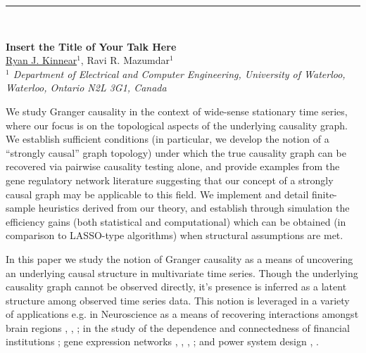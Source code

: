 \documentclass[12pt]{article}
\begin{document}
\hspace{-0.70cm}\rule{17.5cm}{0.01 in} \\
\vspace{-0.4cm}
\begin{flushleft}
\Large \textbf{\noindent
Insert the Title of Your Talk Here}
\\
\vspace{0.5cm}
\normalsize
\normalsize{
 \underline{Ryan J. Kinnear}$^1$, Ravi R. Mazumdar$^1$
} \\
\vspace{5mm}
\textit{\footnotesize
$^1$ Department of Electrical and Computer Engineering, University of Waterloo, Waterloo, Ontario N2L 3G1, Canada\\
}
\end{flushleft}

We study Granger causality in the context of wide-sense stationary
time series, where our focus is on the topological aspects of the
underlying causality graph.  We establish sufficient conditions (in
particular, we develop the notion of a ``strongly causal'' graph
topology) under which the true causality graph can be recovered via
pairwise causality testing alone, and provide examples from the gene
regulatory network literature suggesting that our concept of a
strongly causal graph may be applicable to this field.  We implement
and detail finite-sample heuristics derived from our theory, and
establish through simulation the efficiency gains (both statistical
and computational) which can be obtained (in comparison to LASSO-type
algorithms) when structural assumptions are met.

In this paper we study the notion of Granger causality
\cite{granger1969investigating} \cite{Granger1980329} as a means of
uncovering an underlying causal structure in multivariate time series.
Though the underlying causality graph cannot be observed directly,
it's presence is inferred as a latent structure among observed
time series data.  This notion is leveraged in a variety of
applications e.g. in Neuroscience as a means of recovering
interactions amongst brain regions \cite{bressler2011wiener},
\cite{anna_paper2008}, \cite{david2008identifying}; in the study of
the dependence and connectedness of financial institutions
\cite{NBERw16223}; gene expression networks \cite{Fujita2007},
\cite{methods_for_inferring_gene_regulatory_networks_from_time_series_expression_data},
\cite{grouped_graphical_granger_modelling_for_gene_expression_regulatory_networks_discovery},
\cite{discovering_graphical_Granger_causality_using_the_truncating_lasso_penalty};
and power system design \cite{Misyrlis2016450}, \cite{yuan2014root}.
\end{document}
